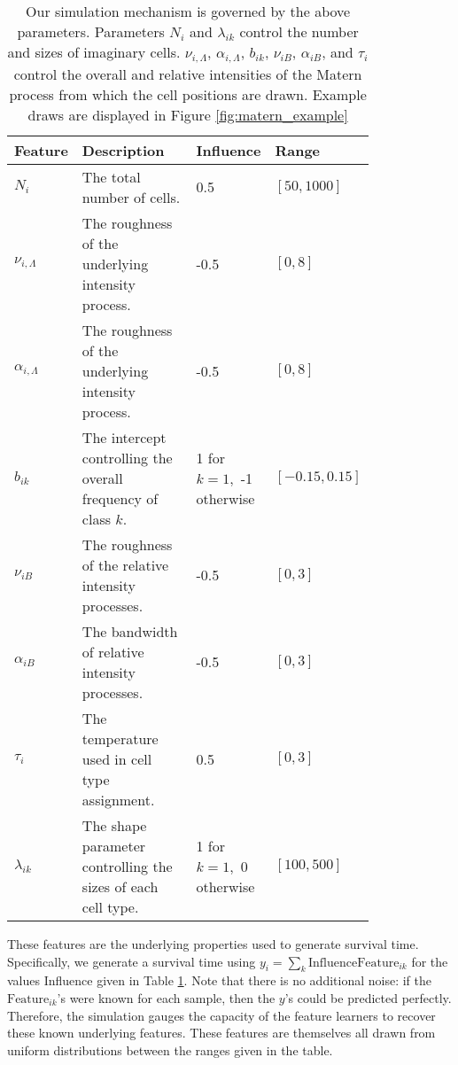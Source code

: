 \begin{table}[]
\begin{tabular}{|p{0.1\linewidth}|p{0.4\linewidth}|p{0.16\linewidth}|p{0.15\linewidth}|}
\hline
\textbf{Feature}              & \textbf{Description}                                 & \textbf{Influence}          & \textbf{Range}             \\
\hline
$N_i$                & The total number of cells.                                    & 0.5                         & $\left[50, 1000\right]$    \\
\hline
$\nu_{i,\Lambda}$    & The roughness of the underlying intensity process.            & -0.5                        & $\left[0, 8\right]$        \\
\hline
$\alpha_{i,\Lambda}$ & The roughness of the underlying intensity process.            & -0.5                        & $\left[0, 8\right]$        \\
\hline
$b_{ik}$             & The intercept controlling the overall frequency of class $k$. & 1 for $k = 1$,\ -1 otherwise & $\left[-0.15, 0.15\right]$ \\
\hline
$\nu_{iB}$           & The roughness of the relative intensity processes.            & -0.5                        & $\left[0, 3\right]$        \\
\hline
$\alpha_{iB}$        & The bandwidth of relative intensity processes.                & -0.5                        & $\left[0, 3\right]$        \\
\hline
$\tau_{i}$           & The temperature used in cell type assignment.                 & 0.5                         & $\left[0, 3\right]$        \\
\hline
$\lambda_{ik}$       & The shape parameter controlling the sizes of each cell type.  & 1 for $k = 1$,\ 0 otherwise  & $\left[100, 500\right]$   \\
\hline
\end{tabular}
\caption{Our simulation mechanism is governed by the above parameters.
  Parameters $N_i$ and $\lambda_{ik}$ control the number and sizes of imaginary
  cells. $\nu_{i, \Lambda}$, $\alpha_{i, \Lambda}$, $b_{ik}$, $\nu_{iB}$,
  $\alpha_{iB}$, and $\tau_{i}$ control the overall and relative intensities of
  the Matern process from which the cell positions are drawn. Example draws are
  displayed in Figure \ref{fig:matern_example}}
\label{tab:sim_params}
\end{table}


These features are the underlying properties used to generate survival time.
Specifically, we generate a survival time using $y_i = \sum_{k}
\text{Influence}\text{Feature}_{ik}$ for the values Influence given in Table
\ref{tab:sim_params}. Note that there is no additional noise: if the
$\text{Feature}_{ik}$'s were known for each sample, then the $y$'s could be
predicted perfectly. Therefore, the simulation gauges the capacity of the
feature learners to recover these known underlying features. These features are
themselves all drawn from uniform distributions between the ranges given in the
table.


